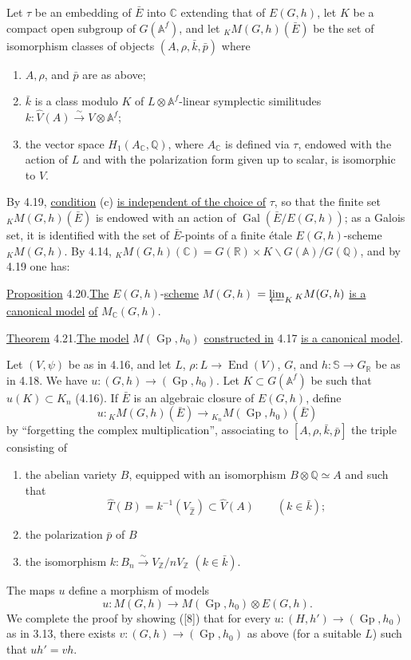 \documentclass[10pt]{article}
\newcommand{\A}{\mathbb A}
\newcommand{\Af}{\mathbb A^f}
\newcommand{\C}{\mathbb C}
\newcommand{\Q}{\mathbb Q}
\newcommand{\R}{\mathbb R}
\newcommand{\Z}{\mathbb Z}
\newcommand{\bS}{\mathbb S}
\newcommand{\Gp}{\operatorname{Gp}}
\newcommand{\Gal}{\operatorname{Gal}}
\newcommand{\End}{\operatorname{End}}
\begin{document}
Let $\tau$ be an embedding of $\bar E$ into $\C$ extending that of $E(G,h)$, let $K$ be a compact open subgroup of $G(\Af)$, and let ${}_K M(G,h)(\bar E)$ be the set of isomorphism classes of objects $(A,\rho,\bar k,\bar p)$ where
\begin{enumerate}[label=(\alph*)]
\item $A,\rho$, and $\bar p$ are as above;
\item $\bar k$ is a class modulo $K$ of $L\otimes\Af$-linear symplectic similitudes $k:\widehat V(A)\xrightarrow{\sim}V\otimes\Af$;
\item the vector space $H_1(A_\C,\Q)$, where $A_\C$ is defined via $\tau$, endowed with the action of $L$ and with the polarization form given up to scalar, is isomorphic to $V$.
\end{enumerate}
By 4.19, \uline{condition} (c) \uline{is independent of the choice of} $\tau$, so that the finite set ${}_K M(G,h)(\bar E)$ is endowed with an action of $\Gal(\bar E/E(G,h))$; as a Galois set, it is identified with the set of $\bar E$-points of a finite étale $E(G,h)$-scheme ${}_K M(G,h)$. By 4.14, ${}_K M(G,h)(\C)=G(\R)\times K\backslash G(\A)/G(\Q)$, and by 4.19 one has:

\noindent \uline{Proposition} 4.20.\quad \uline{The} $E(G,h)$-\uline{scheme} \uline{$M(G,h)$} $=\varprojlim_K {}_K M(G,h)$ \uline{is a canonical model} \uline{of} $M_{\C}(G,h)$.

\noindent \uline{Theorem} 4.21.\quad \uline{The model} $M(\Gp,h_0)$ \uline{constructed in} 4.17 \uline{is a canonical model}.

Let $(V,\psi)$ be as in 4.16, and let $L$, $\rho:L\to\End(V)$, $G$, and $h:\bS\to G_\R$ be as in 4.18. We have $u:(G,h)\longrightarrow(\Gp,h_0)$. Let $K\subset G(\Af)$ be such that $u(K)\subset K_n$ (4.16). If $\bar E$ is an algebraic closure of $E(G,h)$, define
\[
u:{}_K M(G,h)(\bar E)\longrightarrow{}_{K_n}M(\Gp,h_0)(\bar E)
\]
by ``forgetting the complex multiplication'', associating to $[A,\rho,\bar k,\bar p]$ the triple consisting of
\begin{enumerate}[label=(\alph*)]
\item the abelian variety $B$, equipped with an isomorphism $B\otimes\Q\simeq A$ and such that
\[
\widehat T(B)=k^{-1}(V_{\widehat{\Z}})\subset\widehat V(A)\qquad(k\in\bar k);
\]
\item the polarization $\bar p$ of $B$
\item the isomorphism $k:B_n\xrightarrow{\sim}V_\Z/nV_\Z$ $(k\in\bar k)$.
\end{enumerate}
The maps $u$ define a morphism of models
\[
u:M(G,h)\longrightarrow M(\Gp,h_0)\otimes E(G,h).
\]
We complete the proof by showing ([8]) that for every $u:(H,h')\longrightarrow(\Gp,h_0)$ as in 3.13, there exists $v:(G,h)\longrightarrow(\Gp,h_0)$ as above (for a suitable $L$) such that $uh'=vh$.
\end{document}
